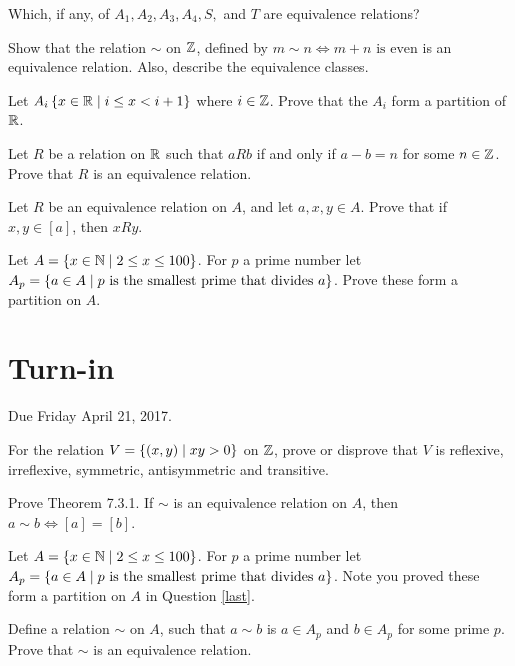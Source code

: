 \documentclass[12pt]{article}
\begin{document}
\begin{qu}
Which, if any, of $A_1, A_2, A_3, A_4, S,$ and $T$ are equivalence relations? \end{qu}

\begin{qu}
Show that the relation $\sim$ on $\mathbb Z$, defined by $m \sim n \iff m+n \textrm{ is even}$ is an equivalence relation. Also, describe the equivalence classes.
\end{qu}

\begin{qu}
Let $A_i \left\{x \in \mathbb R \mid i \leq x < i+1\right\}$ where $i \in \mathbb Z$. Prove that the $A_i$ form a partition of $\mathbb R$.
\end{qu}

\begin{qu} Let $R$ be a relation on $\mathbb R$ such that $a R b$ if and only if $a-b=n$ for some $n \in \mathbb Z$. Prove that $R$ is an equivalence relation. \end{qu}

\begin{qu}
Let $R$ be an equivalence relation on $A$, and let $a, x, y \in A$. Prove that if $x, y \in [a]$, then $x R y$.
\end{qu}

\begin{qu} \label{last}
Let $A=\left\{x \in \mathbb N \mid 2\leq x \leq 100\right\}$. For $p$ a prime number let $A_p = \left\{a \in A \mid p \textrm{ is the smallest prime that divides } a \right\}$. Prove these form a partition on $A$.  \end{qu}

\newpage
\section{Turn-in} 

Due Friday April 21, 2017.


\begin{qu}
For the relation $V=\left\{(x,y) \mid xy>0\right\}$ on $\mathbb Z$, prove or disprove that $V$ is reflexive, irreflexive, symmetric, antisymmetric and transitive.

\end{qu}



\begin{qu}
Prove Theorem 7.3.1. If $\sim$ is an equivalence relation on $A$, then $a \sim b \iff [a] = [b]$.
\end{qu}

\begin{qu}
Let $A=\left\{x \in \mathbb N \mid 2\leq x \leq 100\right\}$. For $p$ a prime number let $A_p = \left\{a \in A \mid p \textrm{ is the smallest prime that divides } a \right\}$. Note you proved these form a partition on $A$ in Question \ref{last}. 

Define a relation $\sim$ on $A$, such that $a \sim b$ is $a \in A_p$ and $b \in A_p$ for some prime $p$. Prove that $\sim$ is an equivalence relation.
\end{qu}
\end{document}
